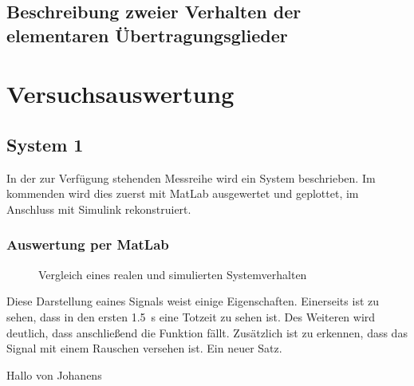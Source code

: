 \documentclass[12pt, oneside, a4paper]{scrreprt}
\begin{document}
\section{Beschreibung zweier Verhalten der elementaren Übertragungsglieder}

\chapter{Versuchsauswertung}
\section{System 1}
In der zur Verfügung stehenden Messreihe wird ein System beschrieben. Im kommenden wird dies zuerst mit MatLab ausgewertet und geplottet, im Anschluss mit Simulink rekonstruiert. 
\subsection{Auswertung per MatLab}





\begin{figure}[H]
\centering
{}
\caption{Vergleich eines realen und simulierten Systemverhalten}
\end{figure}

Diese Darstellung eaines Signals weist einige Eigenschaften. Einerseits ist zu sehen, dass in den ersten \SI{1.5}{\second} eine Totzeit zu sehen ist. Des Weiteren wird deutlich, dass anschließend die Funktion fällt. Zusätzlich ist zu erkennen, dass das Signal mit einem Rauschen versehen ist.
Ein neuer Satz.

Hallo von Johanens
\end{document}
